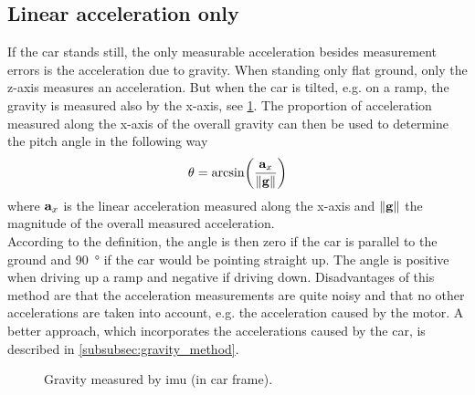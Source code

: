 \subsection{Linear acceleration only}
\label{ssec:linear_acceleration_only}
If the car stands still, the only measurable acceleration besides measurement errors is the acceleration due to gravity.
When standing only flat ground, only the z-axis measures an acceleration.
But when the car is tilted, e.g. on a ramp, the gravity is measured also by the x-axis, see \cref{fig:tikz_car_gravity}.
The proportion of acceleration measured along the x-axis of the overall gravity can then be used to determine the pitch angle in the following way
\begin{equation}
	\label{eq:ang_from_acc}
	\theta = \arcsin(\frac{\vb{a}_x}{\norm{\vb{g}}})
\end{equation}
where $\vb{a}_x$ is the linear acceleration measured along the x-axis and $\norm{\vb{g}}$ the magnitude of the overall measured acceleration.\\
According to the definition, the angle is then zero if the car is parallel to the ground and \SI{90}{\degree} if the car would be pointing straight up.
The angle is positive when driving up a ramp and negative if driving down.
Disadvantages of this method are that the acceleration measurements are quite noisy and that no other accelerations are taken into account, e.g. the acceleration caused by the motor.
A better approach, which incorporates the accelerations caused by the car, is described in \cref{subsubsec:gravity_method}.
\begin{figure}[htpb]
	\centering
	
	\caption{Gravity measured by \acrshort{imu} (in car frame).}
	\label{fig:tikz_car_gravity}
\end{figure}

